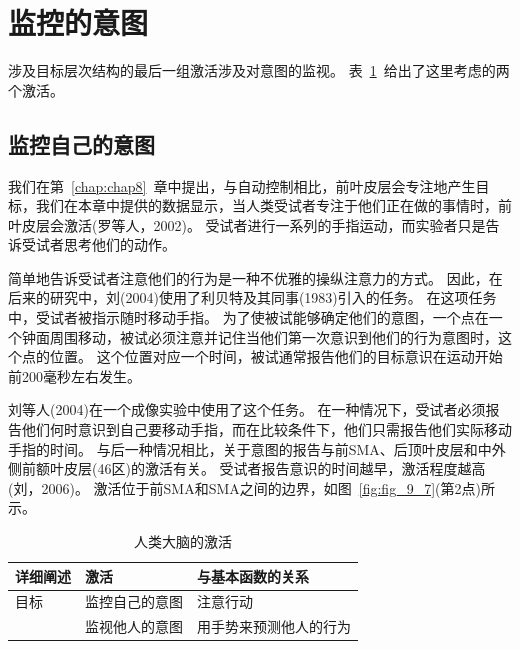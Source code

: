 \section{监控的意图}
\par
涉及目标层次结构的最后一组激活涉及对意图的监视。
表~\ref{tab:9_4}~给出了这里考虑的两个激活。
\par


\subsection{监控自己的意图}
\par
我们在第~\ref{chap:chap8}~章中提出，与自动控制相比，前叶皮层会专注地产生目标，我们在本章中提供的数据显示，当人类受试者专注于他们正在做的事情时，前叶皮层会激活(罗等人，2002)。
受试者进行一系列的手指运动，而实验者只是告诉受试者思考他们的动作。
\par


简单地告诉受试者注意他们的行为是一种不优雅的操纵注意力的方式。
因此，在后来的研究中，刘(2004)使用了利贝特及其同事(1983)引入的任务。
在这项任务中，受试者被指示随时移动手指。
为了使被试能够确定他们的意图，一个点在一个钟面周围移动，被试必须注意并记住当他们第一次意识到他们的行为意图时，这个点的位置。
这个位置对应一个时间，被试通常报告他们的目标意识在运动开始前200毫秒左右发生。
\par


刘等人(2004)在一个成像实验中使用了这个任务。
在一种情况下，受试者必须报告他们何时意识到自己要移动手指，而在比较条件下，他们只需报告他们实际移动手指的时间。
与后一种情况相比，关于意图的报告与前SMA、后顶叶皮层和中外侧前额叶皮层(46区)的激活有关。
受试者报告意识的时间越早，激活程度越高(刘，2006)。
激活位于前SMA和SMA之间的边界，如图~\ref{fig:fig_9_7}(第2点)所示。
\par


\begin{table}[htbp] 
	\newcommand{\tabincell}[2]{\begin{tabular}{@{}#1@{}}#2\end{tabular}} %
	\centering
	\caption{人类大脑的激活\label{tab:9_4}}
	\renewcommand\arraystretch{1.5}	%
	\begin{tabular}{lll}
		\toprule
		详细阐述 & 激活 & 与基本函数的关系\\
		\midrule
		目标 & 监控自己的意图 & 注意行动  \\
		& 监视他人的意图 & 用手势来预测他人的行为 \\
		\bottomrule
		
	\end{tabular}%
\end{table}%


